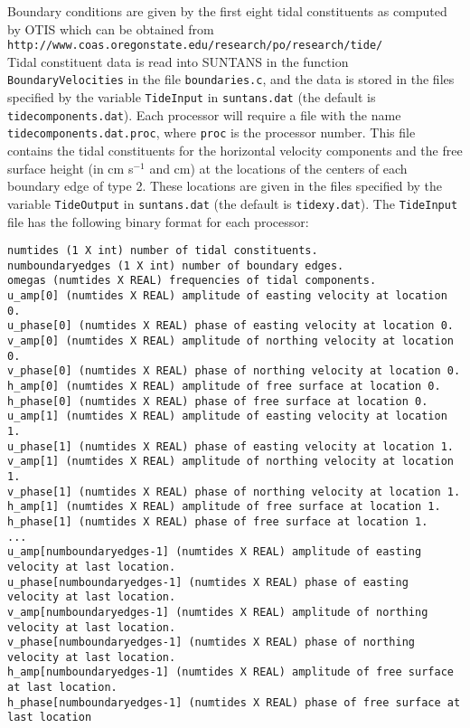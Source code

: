 Boundary conditions are given by the first eight tidal constituents as computed by OTIS which can
be obtained from\\
\verb+http://www.coas.oregonstate.edu/research/po/research/tide/+\\
Tidal constituent data is read into SUNTANS in the function \verb+BoundaryVelocities+ in the file 
\verb+boundaries.c+, and the data is stored in the files specified by the variable
\verb+TideInput+ in \verb+suntans.dat+ (the default is \verb+tidecomponents.dat+).  Each processor
will require a file with the name \verb+tidecomponents.dat.proc+, where \verb+proc+ is the processor
number.  This file contains the tidal constituents for the horizontal velocity components and
the free surface height (in cm s$^{-1}$ and cm) at the locations of the centers of each boundary edge of type 2.
These locations are given in the files specified by the variable \verb+TideOutput+ in \verb+suntans.dat+
(the default is \verb+tidexy.dat+). The \verb+TideInput+ file has the following binary format for each processor:
{\footnotesize
\begin{verbatim}
numtides (1 X int) number of tidal constituents.
numboundaryedges (1 X int) number of boundary edges.
omegas (numtides X REAL) frequencies of tidal components.
u_amp[0] (numtides X REAL) amplitude of easting velocity at location 0.
u_phase[0] (numtides X REAL) phase of easting velocity at location 0.
v_amp[0] (numtides X REAL) amplitude of northing velocity at location 0.
v_phase[0] (numtides X REAL) phase of northing velocity at location 0.
h_amp[0] (numtides X REAL) amplitude of free surface at location 0.
h_phase[0] (numtides X REAL) phase of free surface at location 0.
u_amp[1] (numtides X REAL) amplitude of easting velocity at location 1.
u_phase[1] (numtides X REAL) phase of easting velocity at location 1.
v_amp[1] (numtides X REAL) amplitude of northing velocity at location 1.
v_phase[1] (numtides X REAL) phase of northing velocity at location 1.
h_amp[1] (numtides X REAL) amplitude of free surface at location 1.
h_phase[1] (numtides X REAL) phase of free surface at location 1.
...
u_amp[numboundaryedges-1] (numtides X REAL) amplitude of easting velocity at last location.
u_phase[numboundaryedges-1] (numtides X REAL) phase of easting velocity at last location.
v_amp[numboundaryedges-1] (numtides X REAL) amplitude of northing velocity at last location.
v_phase[numboundaryedges-1] (numtides X REAL) phase of northing velocity at last location.
h_amp[numboundaryedges-1] (numtides X REAL) amplitude of free surface at last location.
h_phase[numboundaryedges-1] (numtides X REAL) phase of free surface at last location 
\end{verbatim}
}
